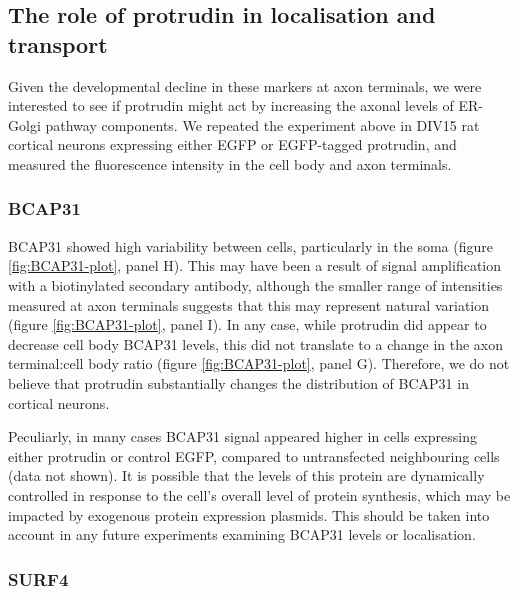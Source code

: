 \documentclass[
  12pt,
  a4paper,
]{book}
\begin{document}
\hypertarget{the-role-of-protrudin-in-localisation-and-transport}{%
\subsection{The role of protrudin in localisation and transport}\label{the-role-of-protrudin-in-localisation-and-transport}}

Given the developmental decline in these markers at axon terminals, we were interested to see if protrudin might act by increasing the axonal levels of ER-Golgi pathway components. We repeated the experiment above in DIV15 rat cortical neurons expressing either EGFP or EGFP-tagged protrudin, and measured the fluorescence intensity in the cell body and axon terminals.

\hypertarget{bcap31}{%
\subsubsection{BCAP31}\label{bcap31}}

BCAP31 showed high variability between cells, particularly in the soma (figure \ref{fig:BCAP31-plot}, panel H). This may have been a result of signal amplification with a biotinylated secondary antibody, although the smaller range of intensities measured at axon terminals suggests that this may represent natural variation (figure \ref{fig:BCAP31-plot}, panel I). In any case, while protrudin did appear to decrease cell body BCAP31 levels, this did not translate to a change in the axon terminal:cell body ratio (figure \ref{fig:BCAP31-plot}, panel G). Therefore, we do not believe that protrudin substantially changes the distribution of BCAP31 in cortical neurons.

Peculiarly, in many cases BCAP31 signal appeared higher in cells expressing either protrudin or control EGFP, compared to untransfected neighbouring cells (data not shown). It is possible that the levels of this protein are dynamically controlled in response to the cell's overall level of protein synthesis, which may be impacted by exogenous protein expression plasmids. This should be taken into account in any future experiments examining BCAP31 levels or localisation.

\hypertarget{surf4}{%
\subsubsection{SURF4}\label{surf4}}
\end{document}
